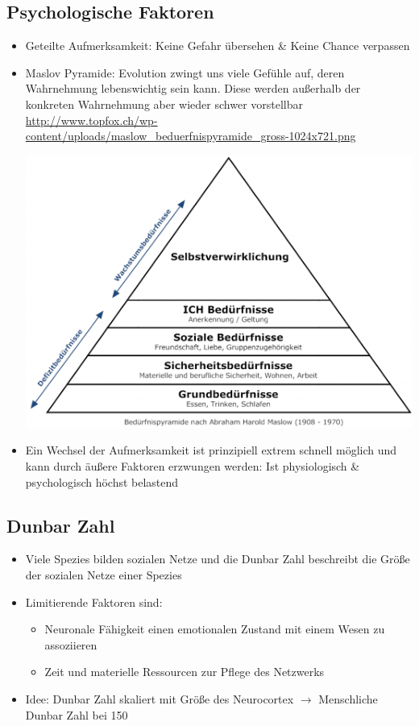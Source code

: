 \documentclass{article} %
\begin{document}
	\subsection{Psychologische Faktoren}
	\begin{itemize}
		\item Geteilte Aufmerksamkeit: Keine Gefahr übersehen \& Keine Chance verpassen
		\item Maslov Pyramide: Evolution zwingt uns viele Gefühle auf, deren Wahrnehmung lebenswichtig sein kann. Diese werden außerhalb der konkreten Wahrnehmung aber wieder schwer vorstellbar\\
		
		\url{http://www.topfox.ch/wp-content/uploads/maslow\_beduerfnispyramide\_gross-1024x721.png}
		
	\begin{center}
		\includegraphics[scale=0.3]{img/maslow.png}
	\end{center}
		\item Ein Wechsel der Aufmerksamkeit ist prinzipiell extrem schnell möglich und kann durch äußere Faktoren erzwungen werden: Ist physiologisch \& psychologisch höchst belastend		
	\end{itemize}	
	\subsection{Dunbar Zahl}
	\begin{itemize}
		\item Viele Spezies bilden sozialen Netze und die Dunbar Zahl beschreibt die Größe der sozialen Netze einer Spezies
		\item Limitierende Faktoren sind:
		\begin{itemize}
			\item Neuronale Fähigkeit einen emotionalen Zustand mit einem Wesen zu assoziieren
			\item Zeit und materielle Ressourcen zur Pflege des Netzwerks
		\end{itemize}
		\item Idee: Dunbar Zahl skaliert mit Größe des Neurocortex $\rightarrow$ Menschliche Dunbar Zahl bei 150
	\end{itemize}
\end{document}
